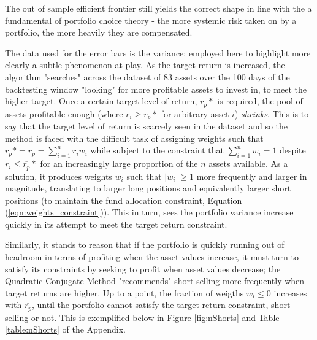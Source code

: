 \documentclass{article}
\begin{document}
The out of sample efficient frontier still yields the correct shape in line with the a fundamental of portfolio choice theory - the more systemic risk taken on by a portfolio, the more heavily they are compensated. 

The data used for the error bars is the variance; employed here to highlight more clearly a subtle phenomenon at play. As the target return is increased, the algorithm "searches" across the dataset of 83 assets over the 100 days of the backtesting window "looking" for more profitable assets to invest in, to meet the higher target. Once a certain target level of return, $\overline{r_p}*$ is required, the pool of assets profitable enough (where $r_i \geq \overline{r_p}*$ for arbitrary asset $i$) \textit{shrinks}. This is to say that the target level of return is scarcely seen in the dataset and so the method is faced with the difficult task of assigning weights such that $\overline{r_p}* = \overline{r_p} = \sum_{i=1}^{n} \overline{r_{i}}w_{i}$ while subject to the constraint that $\sum_{i=1}^{n}w_{i} = 1$ despite $r_i \leq \overline{r_p}*$ for an increasingly large proportion of the $n$ assets available. As a solution, it produces weights ${w_i}$ such that $|w_i| \geq 1$ more frequently and larger in magnitude, translating to larger long positions and equivalently larger short positions (to maintain the fund allocation constraint, Equation (\ref{eqn:weights_constraint})). This in turn, sees the portfolio variance increase quickly in its attempt to meet the target return constraint.

Similarly, it stands to reason that if the portfolio is quickly running out of headroom in terms of profiting when the asset values increase, it must turn to satisfy its constraints by seeking to profit when asset values decrease; the Quadratic Conjugate Method "recommends" short selling more frequently when target returns are higher. Up to a point, the fraction of weigths $w_i \leq 0$ increases with $\overline{r_p}$, until the portfolio cannot satisfy the target return constraint, short selling or not. This is exemplified below in Figure \ref{fig:nShorts} and Table \ref{table:nShorts} of the Appendix.
\end{document}
